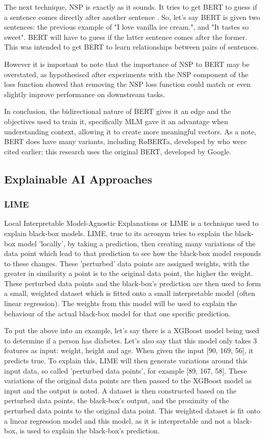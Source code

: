 \documentclass[stu,12pt,floatsintext,donotrepeattitle]{apa7}
\begin{document}
The next technique, NSP is exactly as it sounds. It tries to get BERT to guess if a sentence comes directly after another sentence \parencite{roberta}. So, let's say BERT is given two sentences: the previous example of "I love vanilla ice cream.", and "It tastes so sweet". BERT will have to guess if the latter sentence comes after the former. This was intended to get BERT to learn relationships between pairs of sentences.

However it is important to note that the importance of NSP to BERT may be overstated, as \textcite{roberta} hypothesised after experiments with the NSP component of the loss function showed that removing the NSP loss function could match or even slightly improve performance on downstream tasks. 

In conclusion, the bidirectional nature of BERT gives it an edge and the objectives used to train it, specifically MLM gave it an advantage when understanding context, allowing it to create more meaningful vectors. As a note, BERT does have many variants, including RoBERTa, developed by \textcite{roberta} who were cited earlier; this research uses the original BERT, developed by Google. 

\subsection{Explainable AI Approaches}
\subsubsection{LIME}
Local Interpretable Model-Agnostic Explanations or LIME is a technique used to explain black-box models. LIME, true to its acronym tries to explain the black-box model 'locally', by taking a prediction, then creating many variations of the data point which lead to that prediction to see how the black-box model responds to these changes. These 'perturbed' data points are assigned weights, with the greater in similarity a point is to the original data point, the higher the weight. These perturbed data points and the black-box's prediction are then used to form a small, weighted dataset which is fitted onto a small interpretable model (often linear regression). The weights from this model will be used to explain the behaviour of the actual black-box model for that one specific prediction. 

To put the above into an example, let's say there is a XGBoost model being used to determine if a person has diabetes. Let's also say that this model only takes 3 features as input: weight, height and age. When given the input [90, 169, 56], it predicts true. To explain this, LIME will then generate variations around this input data, so called 'perturbed data points', for example [89, 167, 58]. These variations of the original data points are then passed to the XGBoost model as input and the output is noted. A dataset is then constructed based on the perturbed data points, the black-box's output, and the proximity of the perturbed data points to the original data point. This weighted dataset is fit onto a linear regression model and this model, as it is interpretable and not a black-box, is used to explain the black-box's prediction.
\end{document}
